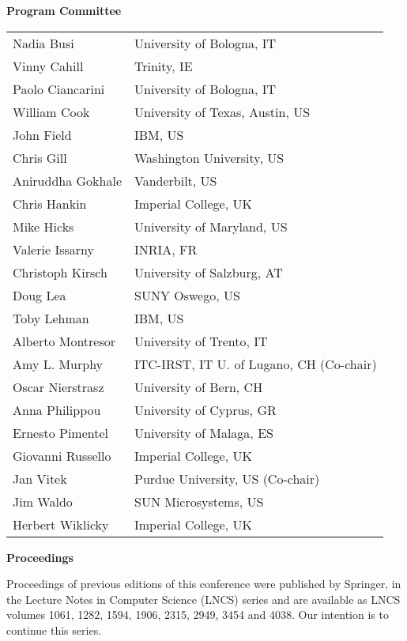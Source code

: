 \documentclass[11pt]{article}
\begin{document}
\begin{center}
{\bf Program Committee}
\\

\begin{longtable}{ll}
  Nadia Busi &          University of Bologna, IT \\
  Vinny Cahill &        Trinity, IE \\
  Paolo Ciancarini &    University of Bologna, IT \\
  William Cook &        University of Texas, Austin, US \\
  John Field &          IBM, US \\
  Chris Gill &          Washington University, US \\
  Aniruddha Gokhale &   Vanderbilt, US \\
  Chris Hankin &        Imperial College, UK \\
  Mike Hicks &          University of Maryland, US \\
  Valerie Issarny &     INRIA, FR \\
  Christoph Kirsch &    University of Salzburg, AT \\
  Doug Lea &            SUNY Oswego, US \\
  Toby Lehman &         IBM, US \\
  Alberto Montresor &   University of Trento, IT \\
  Amy L. Murphy &      ITC-IRST, IT U. of Lugano, CH (Co-chair) \\
  Oscar Nierstrasz &    University of Bern, CH \\
  Anna Philippou &      University of Cyprus, GR \\
  Ernesto Pimentel &    University of Malaga, ES \\
  Giovanni Russello &   Imperial College, UK \\
  Jan Vitek &           Purdue University, US (Co-chair) \\
  Jim Waldo &           SUN Microsystems, US \\
  Herbert Wiklicky &    Imperial College, UK \\
\end{longtable}

{\bf Proceedings}
\end{center}

Proceedings of previous editions of this conference were published by
Springer, in the Lecture Notes in Computer Science (LNCS) series and
are available as LNCS volumes 1061, 1282, 1594, 1906, 2315, 2949, 3454
and 4038. Our intention is to continue this series.
\end{document}
